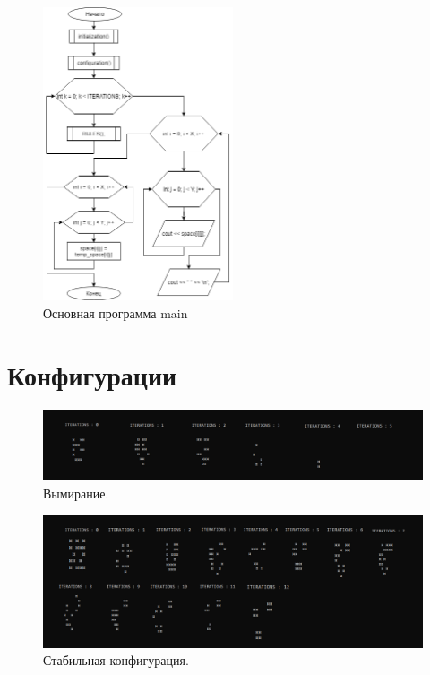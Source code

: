 \documentclass[14pt]{extarticle}
\begin{document}
\begin{figure}[!h]
  \centering
  \includegraphics[width=0.5\textwidth]{main.png}
  \caption{Основная программа main}
\end{figure}
\newpage




\hfill \break
\section{Конфигурации}
\begin{figure}[!h]
  \centering
  \includegraphics[width=1\textwidth]{vimiranie.jpg}
  \caption{Вымирание.}
\end{figure}

\begin{figure}[!h]
  \centering
  \includegraphics[width=1\textwidth]{stabilnost.jpg}
  \caption{Стабильная конфигурация.}
\end{figure}
\end{document}
